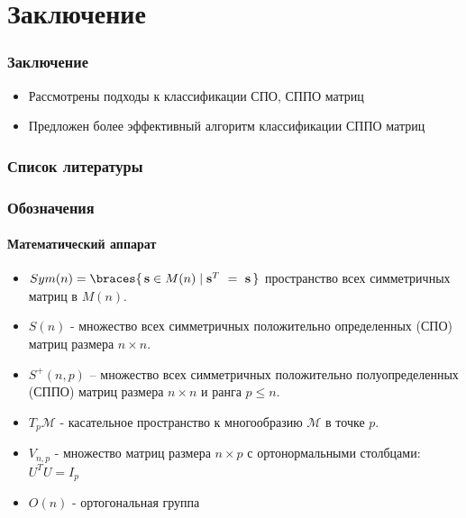 \documentclass[xcolor=table]{beamer}
\newcommand{\bs}{{\bf s}}
\newcommand{\manM}{\mathcal{M}}
\newcommand{\condset}[2]{\braces{\, #1 \mid #2 \,}}
\begin{document}
\section[Заключение]{Заключение}

\begin{frame}
\frametitle{Заключение}
\begin{block}{}
\begin{itemize}
    \item Рассмотрены подходы к классификации СПО, СППО матриц
    \item Предложен более эффективный алгоритм классификации СППО матриц
\end{itemize}
\end{block}
\end{frame}

\begin{frame}[shrink=50,fragile]
    \frametitle{Список литературы}
    
    
\end{frame}

\begin{frame}
    \frametitle{Обозначения}
    \framesubtitle{Математический аппарат}
    
    \begin{itemize}
    	\item $Sym(n) = \condset{\bs \in M(n)}{\bs^T \ = \ \bs}$ пространство всех симметричных матриц в $M(n)$.
    	\item $S(n)$ - множество всех симметричных положительно определенных (СПО) матриц размера $n \times n$.
    	\item $S^+(n, p)$ – множество всех симметричных положительно полуопределенных (СППО) матриц размера $n \times n$ и ранга $p \leq n$.
    	\item $T_p \manM$ - касательное пространство к многообразию $\manM$ в точке $p$.
    	\item $V_{n,p}$ - множество матриц размера $n \times p$ с ортонормальными столбцами: $U^TU=I_p$
    	\item $O(n)$ - ортогональная группа
    \end{itemize}
    
    \end{frame}
    
\end{document}
